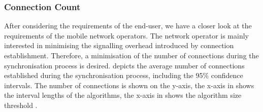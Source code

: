 \subsubsection*{Connection Count}\label{sec:application:cloud_file_synchronisation:numerical_evaluation:connection_count}

After considering the requirements of the end-user, we have a closer look at the requirements of the mobile network operators.
The network operator is mainly interested in minimising the signalling overhead introduced by connection establishment.
Therefore, a minimisation of the number of connections \connectionCount during the synchronisation process is desired.
 depicts the average number of connections \connectionCount established during the synchronisation process, including the 95\% confidence intervals.
The number of connections is shown on the y-axis, the x-axis in  shows the interval lengths \thresholdInterval of the \algointerval algorithms, the x-axis in  shows the \algosize algorithm size threshold \thresholdSize.

